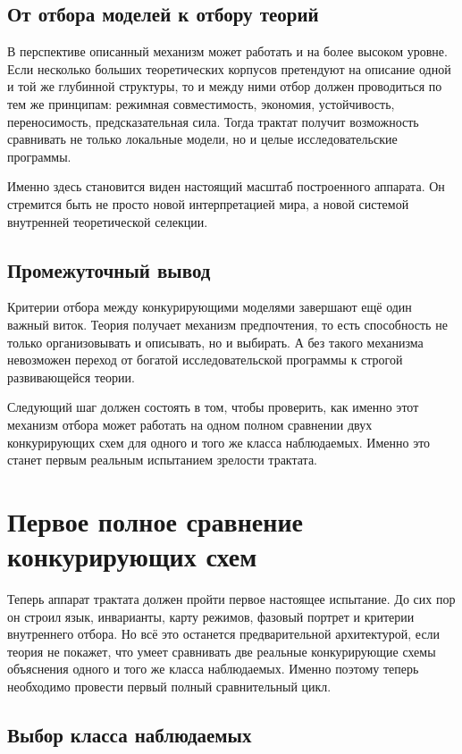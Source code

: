 \documentclass[12pt,a4paper]{article}
\begin{document}
\subsection{От отбора моделей к отбору теорий}

В перспективе описанный механизм может работать и на более высоком уровне. Если несколько больших теоретических корпусов претендуют на описание одной и той же глубинной структуры, то и между ними отбор должен проводиться по тем же принципам: режимная совместимость, экономия, устойчивость, переносимость, предсказательная сила. Тогда трактат получит возможность сравнивать не только локальные модели, но и целые исследовательские программы.

Именно здесь становится виден настоящий масштаб построенного аппарата. Он стремится быть не просто новой интерпретацией мира, а новой системой внутренней теоретической селекции.

\subsection{Промежуточный вывод}

Критерии отбора между конкурирующими моделями завершают ещё один важный виток. Теория получает механизм предпочтения, то есть способность не только организовывать и описывать, но и выбирать. А без такого механизма невозможен переход от богатой исследовательской программы к строгой развивающейся теории.

Следующий шаг должен состоять в том, чтобы проверить, как именно этот механизм отбора может работать на одном полном сравнении двух конкурирующих схем для одного и того же класса наблюдаемых. Именно это станет первым реальным испытанием зрелости трактата.


\section{Первое полное сравнение конкурирующих схем}

Теперь аппарат трактата должен пройти первое настоящее испытание. До сих пор он строил язык, инварианты, карту режимов, фазовый портрет и критерии внутреннего отбора. Но всё это останется предварительной архитектурой, если теория не покажет, что умеет сравнивать две реальные конкурирующие схемы объяснения одного и того же класса наблюдаемых. Именно поэтому теперь необходимо провести первый полный сравнительный цикл.

\subsection{Выбор класса наблюдаемых}
\end{document}
